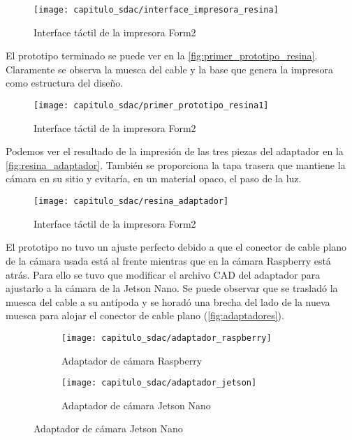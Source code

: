 \begin{figure}[H]
    \centering
    \texttt{[image: capitulo\_sdac/interface\_impresora\_resina]}
    \caption{Interface táctil de la impresora Form2}\label{fig:interface_impresora_resina}
\end{figure}


El prototipo terminado se puede ver en la \autoref{fig:primer_prototipo_resina}.
Claramente se observa la muesca del cable y la base que genera la impresora como
estructura del diseño.

\begin{figure}[H]
    \centering
    \texttt{[image: capitulo\_sdac/primer\_prototipo\_resina1]}
    \caption{Interface táctil de la impresora Form2}\label{fig:primer_prototipo_resina}
\end{figure}

Podemos ver el resultado de la impresión de las tres piezas del adaptador en la
\autoref{fig:resina_adaptador}. También se proporciona la tapa trasera que
mantiene la cámara en su sitio y evitaría, en un material opaco, el paso de la
luz.

\begin{figure}[H]
    \centering
    \texttt{[image: capitulo\_sdac/resina\_adaptador]}
    \caption{Interface táctil de la impresora Form2}\label{fig:resina_adaptador}
\end{figure}

El prototipo no tuvo un ajuste perfecto debido a que el conector de cable plano
de la cámara usada está al frente mientras que en la cámara Raspberry está
atrás. Para ello se tuvo que modificar el archivo CAD del adaptador para
ajustarlo a la cámara de la Jetson Nano. Se puede observar que se trasladó la
muesca del cable a su antípoda y se horadó una brecha del lado de la nueva
muesca para alojar el conector de cable plano (\autoref{fig:adaptadores}).

\begin{figure}[H]
    \centering
    \begin{subfigure}{.5\textwidth}
        \centering
        \texttt{[image: capitulo\_sdac/adaptador\_raspberry]}
        \caption{Adaptador de cámara Raspberry}
    \end{subfigure}%
    \begin{subfigure}{.5\textwidth}
        \centering
        \texttt{[image: capitulo\_sdac/adaptador\_jetson]}
        \caption{Adaptador de cámara Jetson Nano}
    \end{subfigure}
    \caption{Adaptador de cámara Jetson Nano}\label{fig:adaptadores}
    \end{figure}

